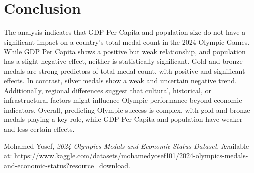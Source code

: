 \documentclass[a4paper,12pt]{article}
\begin{document}
\section{Conclusion}

The analysis indicates that GDP Per Capita and population size do not have a significant impact on a country's total medal count in the 2024 Olympic Games. While GDP Per Capita shows a positive but weak relationship, and population has a slight negative effect, neither is statistically significant.
\newline
Gold and bronze medals are strong predictors of total medal count, with positive and significant effects. In contrast, silver medals show a weak and uncertain negative trend.
\newline
Additionally, regional differences suggest that cultural, historical, or infrastructural factors might influence Olympic performance beyond economic indicators.
\newline
Overall, predicting Olympic success is complex, with gold and bronze medals playing a key role, while GDP Per Capita and population have weaker and less certain effects.



\begin{thebibliography}{9}
Mohamed Yosef, \emph{2024 Olympics Medals and Economic Status Dataset}. Available at: \url{https://www.kaggle.com/datasets/mohamedyosef101/2024-olympics-medals-and-economic-status?resource=download}.
\end{thebibliography}
\end{document}
